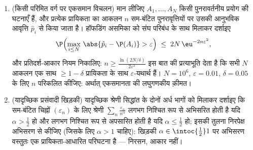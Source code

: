 \begin{problem}
\begin{enumerate}[resume]
  \item (किसी परिमित वर्ग पर एकसमान विचलन) मान लीजिए $A_1,
        \dots, A_N$ किसी
        पुनरावर्तनीय प्रयोग की घटनाएँ हैं, और प्रत्येक प्रायिकता
        का आकलन $n$  सम-बंटित पुनरावृत्तियों पर उसकी
        आनुभविक आवृत्ति $\hat p_i$ से किया जाता है। हॉफडिंग असमिका को
        संघ परिबंध के साथ मिलाकर दर्शाइए
        \[
        \P\Bigl(\max_{i\leq N}\,\abs{\hat p_i - \P(A_i)} >
        \varepsilon\Bigr) \;\leq\; 2N\,\eu^{-2n\varepsilon^2},
        \]
        और प्रतिदर्श-आकार नियम निकालिए: $n \geq
        \frac{\ln(2N/\delta)}{2\varepsilon^2}$ इस बात की प्रत्याभूति
        देता है कि सभी $N$ आकलन एक साथ $\geq 1 -
        \delta$ प्रायिकता के साथ
        $\varepsilon$-यथार्थ हैं। $N = 10^6$, $\varepsilon =
        0.01$, $\delta = 0.05$ के लिए $n$ परिकलित
        कीजिए: अर्थात् एकसमानता की लघुगणकीय क़ीमत।
  \item (यादृच्छिक प्रसंवादी खिड़की) यादृच्छिक श्रेणी सिद्धांत के
        दोनों अर्ध भागों को मिलाकर दर्शाइए कि  सम-बंटित
        चिह्नों $(\varepsilon_n)$ के लिए श्रेणी $\sum_n\frac{\varepsilon_n}{n^\alpha}$ लगभग निश्चित रूप से
        अभिसरित होती है यदि $\alpha > \frac12$ हो और लगभग निश्चित रूप से अपसारित
        होती है यदि $\alpha \leq \frac12$ हो; इसकी तुलना निरपेक्ष अभिसरण से कीजिए
        (जिसके लिए $\alpha > 1$ चाहिए): खिड़की $\alpha \in \intoc{\frac12}1$ पर अभिसरण वस्तुतः
        एक प्रायिकता-आधारित परिघटना है --- निरसन, आकार नहीं।
\end{enumerate}
\end{problem}
